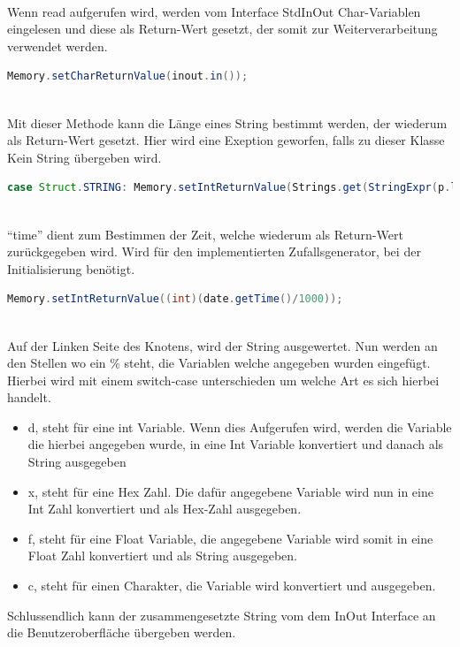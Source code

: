 \\
Wenn read aufgerufen wird, werden vom Interface StdInOut Char-Variablen eingelesen und diese als Return-Wert gesetzt, der somit zur Weiterverarbeitung verwendet werden.
\begin{lstlisting}[language=JAVA]
Memory.setCharReturnValue(inout.in());
\end{lstlisting}

\\
Mit dieser Methode kann die Länge eines String bestimmt werden, der wiederum als Return-Wert gesetzt. Hier wird eine Exeption geworfen, falls zu dieser Klasse Kein String übergeben wird.
\begin{lstlisting}[language=JAVA]
case Struct.STRING:	Memory.setIntReturnValue(Strings.get(StringExpr(p.left)).length());
\end{lstlisting}

\\
``time'' dient zum Bestimmen der Zeit, welche wiederum als Return-Wert zurückgegeben wird. Wird für den implementierten Zufallsgenerator, bei der Initialisierung benötigt.
\begin{lstlisting}[language=JAVA]
Memory.setIntReturnValue((int)(date.getTime()/1000));
\end{lstlisting}

\\
Auf der Linken Seite des Knotens, wird der String ausgewertet. Nun werden an den Stellen wo ein \% steht, die Variablen welche angegeben wurden eingefügt. Hierbei wird mit einem switch-case unterschieden um welche Art es sich hierbei handelt.
\begin{itemize}
\item d, steht für eine int Variable. Wenn dies Aufgerufen wird, werden die Variable die hierbei angegeben wurde, in eine Int Variable konvertiert und danach als String ausgegeben
\item x, steht für eine Hex Zahl. Die dafür angegebene Variable wird nun in eine Int Zahl konvertiert und als Hex-Zahl ausgegeben.
\item f, steht für eine Float Variable, die angegebene Variable wird somit in eine Float Zahl konvertiert und als String ausgegeben.
\item c, steht für einen Charakter, die Variable wird konvertiert und ausgegeben. 
\end{itemize}
Schlussendlich kann der zusammengesetzte String vom dem InOut Interface an die Benutzeroberfläche übergeben werden.

